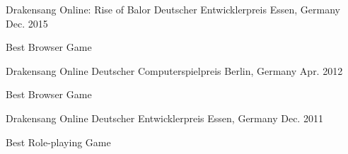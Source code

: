 

\begin{cventries}

\cventry
  {Drakensang Online: Rise of Balor} %
  {Deutscher Entwicklerpreis} %
  {Essen, Germany} %
  {Dec. 2015} %
  {
    \begin{cvitems} %
      \item {Best Browser Game}
    \end{cvitems}
  }

\cventry
  {Drakensang Online} %
  {Deutscher Computerspielpreis} %
  {Berlin, Germany} %
  {Apr. 2012} %
  {
    \begin{cvitems} %
      \item {Best Browser Game}
    \end{cvitems}
  }

\cventry
  {Drakensang Online} %
  {Deutscher Entwicklerpreis} %
  {Essen, Germany} %
  {Dec. 2011} %
  {
    \begin{cvitems} %
      \item {Best Role-playing Game}
    \end{cvitems}
  }

\end{cventries}
